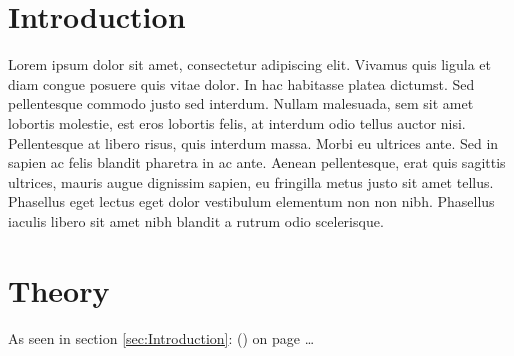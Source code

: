 \documentclass[10pt, a4paper]{article}
\begin{document}
\section{Introduction \label{sec:Introduction}}

Lorem ipsum dolor sit amet, consectetur adipiscing elit. Vivamus quis ligula et diam congue posuere quis vitae dolor. In hac habitasse platea dictumst. Sed pellentesque commodo justo sed interdum. Nullam malesuada, sem sit amet lobortis molestie, est eros lobortis felis, at interdum odio tellus auctor nisi. Pellentesque at libero risus, quis interdum massa. Morbi eu ultrices ante. Sed in sapien ac felis blandit pharetra in ac ante. Aenean pellentesque, erat quis sagittis ultrices, mauris augue dignissim sapien, eu fringilla metus justo sit amet tellus. Phasellus eget lectus eget dolor vestibulum elementum non non nibh. Phasellus iaculis libero sit amet nibh blandit a rutrum odio scelerisque.

\newpage

\section{Theory \label{sec:Theory}}
As seen in section \ref{sec:Introduction}: () on page \pageref{sec:Introduction}\ldots
\end{document}
